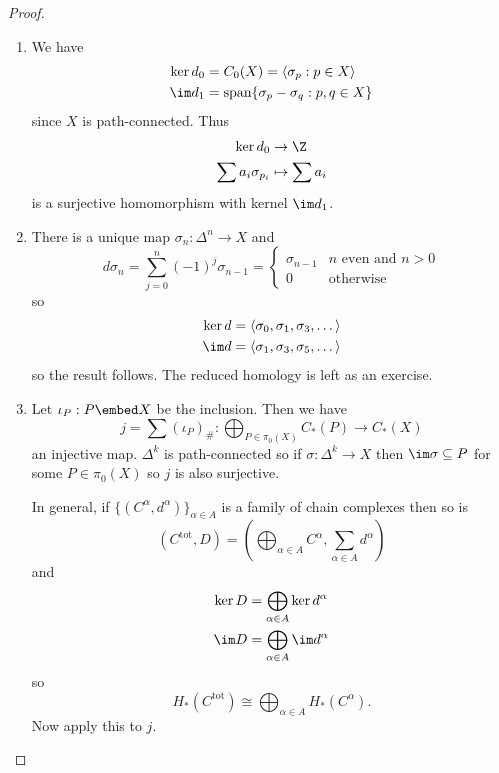 \documentclass[a4paper]{article}
\begin{document}
\begin{proof}\leavevmode
  \begin{enumerate}
  \item We have
    \begin{align*}
      \ker d_0 &= C_0(X) = \langle \sigma_p: p \in X \rangle \\
      \im d_1 &= \text{span} \{\sigma_p - \sigma_q: p, q \in X\}
    \end{align*}
    since \(X\) is path-connected. Thus
    \begin{align*}
      \ker d_0 &\to \Z \\
      \sum a_i \sigma_{p_i} &\mapsto \sum a_i
    \end{align*}
    is a surjective homomorphism with kernel \(\im d_1\).
  \item There is a unique map \(\sigma_n: \Delta^n \to X\) and
    \[
      d \sigma_n = \sum_{j = 0}^n (-1)^j \sigma_{n - 1} =
      \begin{cases}
        \sigma_{n - 1} & n \text{ even and } n > 0 \\
        0 & \text{otherwise}
      \end{cases}
    \]
    so
    \begin{align*}
      \ker d &= \langle \sigma_0, \sigma_1, \sigma_3, \dots \rangle \\
      \im d &= \langle \sigma_1, \sigma_3, \sigma_5, \dots \rangle
    \end{align*}
    so the result follows. The reduced homology is left as an exercise.
  \item Let \(\iota_P: P \embed X\) be the inclusion. Then we have
    \[
      j = \sum (\iota_P)_\#: \bigoplus_{P \in \pi_0(X)} C_*(P) \to C_*(X)
    \]
    an injective map. \(\Delta^k\) is path-connected so if \(\sigma: \Delta^k \to X\) then \(\im \sigma \subseteq P\) for some \(P \in \pi_0(X)\) so \(j\) is also surjective.

    In general, if \(\{(C^\alpha, d^\alpha)\}_{\alpha \in A}\) is a family of chain complexes then so is
    \[
      (C^{\text{tot}}, D) = (\bigoplus_{\alpha \in A} C^\alpha, \sum_{\alpha \in A} d^\alpha)
    \]
    and
    \begin{align*}
      \ker D &= \bigoplus_{\alpha \in A} \ker d^\alpha \\
      \im D &= \bigoplus_{\alpha \in A} \im d^\alpha
    \end{align*}
    so
    \[
      H_*(C^{\text{tot}}) \cong \bigoplus_{\alpha \in A} H_*(C^\alpha).
    \]
    Now apply this to \(j\).
  \end{enumerate}
\end{proof}
\end{document}
